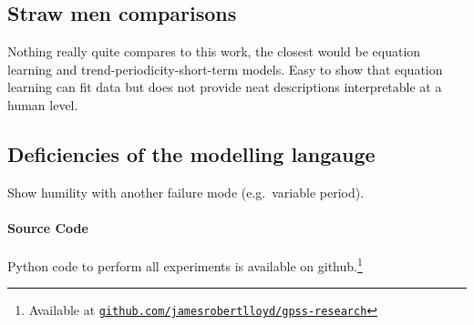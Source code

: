 \documentclass[twoside]{article}
\def\eg{e.g.\ }
\begin{document}


\subsection{Straw men comparisons}

Nothing really quite compares to this work, the closest would be equation learning and trend-periodicity-short-term models.
Easy to show that equation learning can fit data but does not provide neat descriptions interpretable at a human level.

\subsection{Deficiencies of the modelling langauge}

Show humility with another failure mode (\eg variable period).

\paragraph{Source Code}
Python code to perform all experiments is available on github.\footnote{Available at 
\href{http://www.github.com/jamesrobertlloyd/gpss-research}
{\texttt{github.com/jamesrobertlloyd/gpss-research}}}

\end{document}
